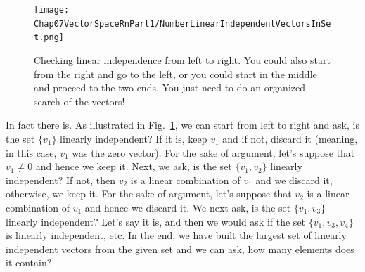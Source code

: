 \begin{figure}[htb]%
	\centering
\texttt{[image: Chap07VectorSpaceRnPart1/NumberLinearIndependentVectorsInSet.png]}%
\caption[]{Checking linear independence from left to right. You could also start from the right and go to the left, or you could start in the middle and proceed to the two ends. You just need to do an organized search of the vectors!}
    \label{fig:NumberLinearlyIndependentVectors}
\end{figure}

In fact there is. As illustrated in Fig.~\ref{fig:NumberLinearlyIndependentVectors}, we can start from left to right and ask, is the set $\{v_1\}$ linearly independent? If it is, keep $v_1$ and if not, discard it (meaning, in this case, $v_1$ was the zero vector). For the sake of argument, let's suppose that $v_1 \neq 0$ and hence we keep it. Next, we ask, is the set $\{ v_1, v_2\}$ linearly independent? If not, then $v_2$ is a linear combination of $v_1$ and we discard it, otherwise, we keep it. For the sake of argument, let's suppose that $v_2$ is a linear combination of $v_1$ and hence we discard it. We next ask, is the set $\{ v_1, v_3\}$ linearly independent? Let's say it is, and then we would ask if the set  $\{ v_1, v_3, v_4\}$ is linearly independent, etc. In the end, we have built the largest set of linearly independent vectors from the given set and we can ask, how many elements does it contain? 

\vspace*{.5cm}


